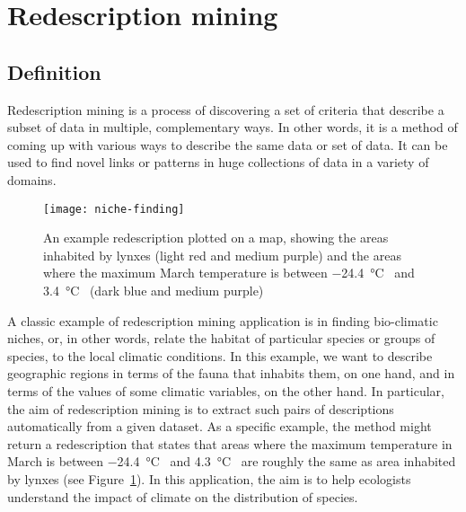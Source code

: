 \section{Redescription mining}
\subsection{Definition}
Redescription mining is a process of discovering a set of criteria that describe a subset of data in multiple, complementary ways.
In other words, it is a method of coming up with various ways to describe the same data or set of data.
It can be used to find novel links or patterns in huge collections of data in a variety of domains.

\begin{figure}[bt]
    \centering
    \texttt{[image: niche-finding]}
    \caption{An example redescription plotted on a map, showing the areas inhabited by lynxes (light red and medium purple) and the areas where the maximum March temperature is between \SI{-24.4}{\degreeCelsius{}} and \SI{3.4}{\degreeCelsius{}} (dark blue and medium purple) \cite{galbrun2018redescription}}
    \label{fig:niche}
\end{figure}
A classic example of redescription mining application is in finding bio-climatic niches, or, in other words, relate the habitat of particular species or groups of species, to the local climatic conditions.
In this example, we want to describe geographic regions in terms of the fauna that inhabits them, on one hand, and in terms of the values of some climatic variables, on the other hand. In particular, the aim of redescription mining is to extract such pairs of descriptions automatically from a given dataset.
As a specific example, the method might return a redescription that states that areas where the maximum temperature in March is between \SI{-24.4}{\degreeCelsius{}} and \SI{4.3}{\degreeCelsius{}} are roughly the same as area inhabited by lynxes (see Figure~\ref{fig:niche}).
In this application, the aim is to help ecologists understand the impact of climate on the distribution of species.


